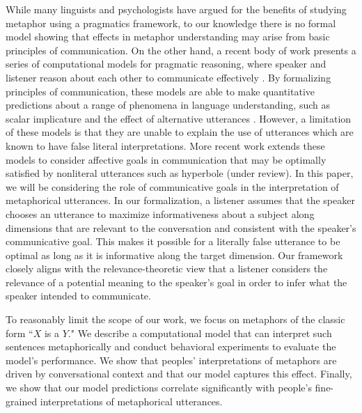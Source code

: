 \documentclass[10pt,letterpaper]{article}
\begin{document}
While many linguists and psychologists have argued for the benefits of studying metaphor using a pragmatics framework, to our knowledge there is no formal model showing that effects in metaphor understanding may arise from basic principles of communication. On the other hand, a recent body of work presents a series of computational models for pragmatic reasoning, where speaker and listener reason about each other to communicate effectively \cite{frank2012predicting, jager2009pragmatic}. By formalizing principles of communication, these models are able to make quantitative predictions about a range of phenomena in language understanding, such as scalar implicature and the effect of alternative utterances \cite{goodman2013knowledge, bergen2012s}. However, a limitation of these models is that they are unable to explain the use of utterances which are known to have false literal interpretations. More recent work extends these models to consider affective goals in communication that may be optimally satisfied by nonliteral utterances such as hyperbole (under review). In this paper, we will be considering the role of communicative goals in the interpretation of metaphorical utterances. In our formalization, a listener assumes that the speaker chooses an utterance to maximize informativeness about a subject along dimensions that are relevant to the conversation and consistent with the speaker's communicative goal. This makes it possible for a literally false utterance to be optimal as long as it is informative along the target dimension. Our framework closely aligns with the relevance-theoretic view that a listener considers the relevance of a potential meaning to the speaker's goal in order to infer what the speaker intended to communicate. 

To reasonably limit the scope of our work, we focus on metaphors of the classic form ``$X$ is a $Y$." We describe a computational model that can interpret such sentences metaphorically and conduct behavioral experiments to evaluate the model's performance. We show that peoples' interpretations of metaphors are driven by conversational context and that our model captures this effect. Finally, we show that our model predictions correlate significantly with people's fine-grained interpretations of metaphorical utterances.
\end{document}
